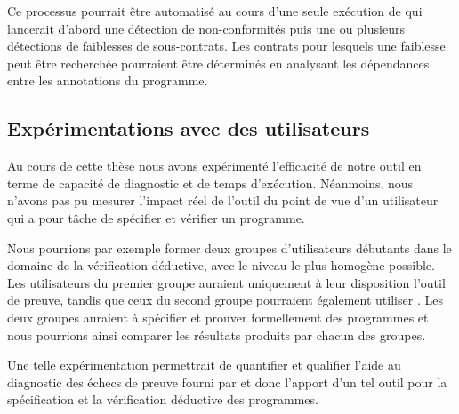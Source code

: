 Ce processus pourrait être automatisé au cours d'une seule exécution de \stady
qui lancerait d'abord une détection de non-conformités puis une ou plusieurs
détections de faiblesses de sous-contrats.
Les contrats pour lesquels une faiblesse peut être recherchée pourraient être
déterminés en analysant les dépendances entre les annotations du programme.


\subsection{Expérimentations avec des utilisateurs}


Au cours de cette thèse nous avons expérimenté l'efficacité de notre outil en
terme de capacité de diagnostic et de temps d'exécution.
Néanmoins, nous n'avons pas pu mesurer l'impact réel de l'outil du point de vue
d'un utilisateur qui a pour tâche de spécifier et vérifier un programme.

Nous pourrions par exemple former deux groupes d'utilisateurs débutants dans le
domaine de la vérification déductive, avec le niveau le plus homogène possible.
Les utilisateurs du premier groupe auraient uniquement à leur disposition
l'outil de preuve, tandis que ceux du second groupe pourraient également
utiliser \stady.
Les deux groupes auraient à spécifier et prouver formellement des programmes
et nous pourrions ainsi comparer les résultats produits par chacun des groupes.

Une telle expérimentation permettrait de quantifier et qualifier l'aide au
diagnostic des échecs de preuve fourni par \stady et donc l'apport d'un tel
outil pour la spécification et la vérification déductive des programmes.
